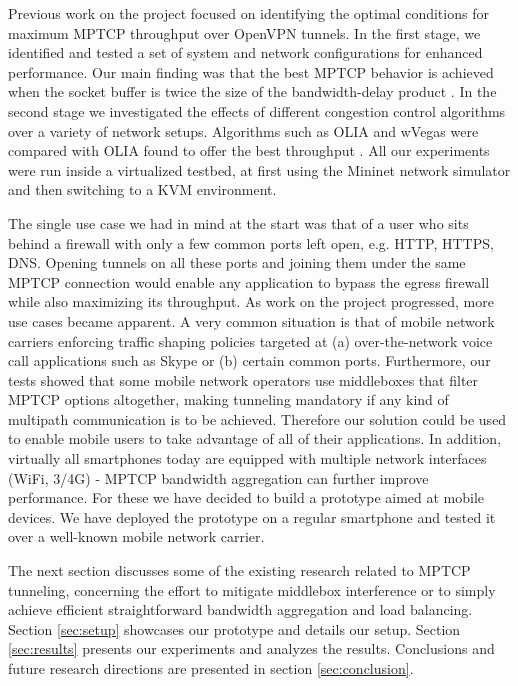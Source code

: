 Previous work on the project focused on identifying the optimal conditions for maximum MPTCP throughput over OpenVPN tunnels. In the first stage, we identified and tested a set of system and network configurations for enhanced performance. Our main finding was that the best MPTCP behavior is achieved when the socket buffer is twice the size of the bandwidth-delay product \cite{sem2}. In the second stage we investigated the effects of different congestion control algorithms over a variety of network setups. Algorithms such as OLIA and wVegas were compared with OLIA found to offer the best throughput \cite{sem3}. All our experiments were run inside a virtualized testbed, at first using the Mininet network simulator and then switching to a KVM environment.

The single use case we had in mind at the start was that of a user who sits behind a firewall with only a few common ports left open, e.g. HTTP, HTTPS, DNS. Opening tunnels on all these ports and joining them under the same MPTCP connection would enable any application to bypass the egress firewall while also maximizing its throughput. As work on the project progressed, more use cases became apparent. A very common situation is that of mobile network carriers enforcing traffic shaping policies targeted at (a) over-the-network voice call applications such as Skype or (b) certain common ports. Furthermore, our tests showed that some mobile network operators use middleboxes that filter MPTCP options altogether, making tunneling mandatory if any kind of multipath communication is to be achieved. Therefore our solution could be used to enable mobile users to take advantage of all of their applications. In addition, virtually all smartphones today are equipped with multiple network interfaces (WiFi, 3/4G) - MPTCP bandwidth aggregation can further improve performance. For these we have decided to build a prototype aimed at mobile devices. We have deployed the prototype on a regular smartphone and tested it over a well-known mobile network carrier.

The next section discusses some of the existing research related to MPTCP tunneling, concerning the effort to mitigate middlebox interference or to simply achieve efficient straightforward bandwidth aggregation and load balancing. Section \ref{sec:setup} showcases our prototype and details our setup. Section \ref{sec:results} presents our experiments and analyzes the results. Conclusions and future research directions are presented in section \ref{sec:conclusion}.